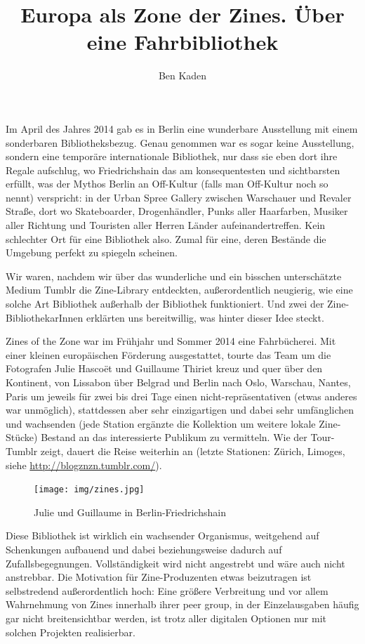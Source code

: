 \documentclass[a4paper,
fontsize=11pt,
oneside,
numbers=noperiodatend,
parskip=half-,
bibliography=totoc,
final
]{scrartcl}
\title{\LARGE{Europa als Zone der Zines. Über eine Fahrbibliothek
}} %
\author{Ben Kaden} %
\date{}
\begin{document}
\maketitle
\thispagestyle{fancyplain} 


Im April des Jahres 2014 gab es in Berlin eine wunderbare Ausstellung
mit einem sonderbaren Bibliotheksbezug. Genau genommen war es sogar
keine Ausstellung, sondern eine temporäre internationale Bibliothek, nur
dass sie eben dort ihre Regale aufschlug, wo Friedrichshain das am
konsequentesten und sichtbarsten erfüllt, was der Mythos Berlin an
Off-Kultur (falls man Off-Kultur noch so nennt) verspricht: in der Urban
Spree Gallery zwischen Warschauer und Revaler Straße, dort wo
Skateboarder, Drogenhändler, Punks aller Haarfarben, Musiker aller
Richtung und Touristen aller Herren Länder aufeinandertreffen. Kein
schlechter Ort für eine Bibliothek also. Zumal für eine, deren Bestände
die Umgebung perfekt zu spiegeln scheinen.

Wir waren, nachdem wir über das wunderliche und ein bisschen
unterschätzte Medium Tumblr die Zine-Library entdeckten, außerordentlich
neugierig, wie eine solche Art Bibliothek außerhalb der Bibliothek
funktioniert. Und zwei der Zine-BibliothekarInnen erklärten uns
bereitwillig, was hinter dieser Idee steckt.

Zines of the Zone war im Frühjahr und Sommer 2014 eine Fahrbücherei. Mit
einer kleinen europäischen Förderung ausgestattet, tourte das Team um
die Fotografen Julie Hascoët und Guillaume Thiriet kreuz und quer über
den Kontinent, von Lissabon über Belgrad und Berlin nach Oslo, Warschau,
Nantes, Paris um jeweils für zwei bis drei Tage einen
nicht-repräsentativen (etwas anderes war unmöglich), stattdessen aber
sehr einzigartigen und dabei sehr umfänglichen und wachsenden (jede
Station ergänzte die Kollektion um weitere lokale Zine-Stücke) Bestand
an das interessierte Publikum zu vermitteln. Wie der Tour-Tumblr zeigt,
dauert die Reise weiterhin an (letzte Stationen: Zürich, Limoges, siehe
\url{http://blogznzn.tumblr.com/}).

\begin{figure}[htbp]
\centering
\texttt{[image: img/zines.jpg]}
\caption{Julie und Guillaume in Berlin-Friedrichshain}
\end{figure}

Diese Bibliothek ist wirklich ein wachsender Organismus, weitgehend auf
Schenkungen aufbauend und dabei beziehungsweise dadurch auf
Zufallsbegegnungen. Vollständigkeit wird nicht angestrebt und wäre auch
nicht anstrebbar. Die Motivation für Zine-Produzenten etwas beizutragen
ist selbstredend außerordentlich hoch: Eine größere Verbreitung und vor
allem Wahrnehmung von Zines innerhalb ihrer peer group, in der
Einzelausgaben häufig gar nicht breitensichtbar werden, ist trotz aller
digitalen Optionen nur mit solchen Projekten realisierbar.
\end{document}
